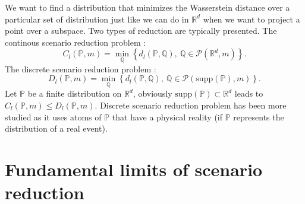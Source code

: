 \documentclass{amsart}
\newcommand{\RR}{\mathbb{R}}
\begin{document}
We want to find a distribution that minimizes the Wasserstein distance over a particular set of distribution just like we can do in $\RR^d$ when we want to project a point over a subspace. Two types of reduction are typically presented. The continous scenario reduction problem :
$$
C_l(\mathbb{P},m)=\min_\mathbb{Q}\left\{d_l(\mathbb{P},\mathbb{Q}),\: \mathbb{Q}\in\mathcal{P}(\mathbb{R}^d,m)\right\}. 
$$
The discrete scenario reduction problem :
$$
D_l(\mathbb{P},m)=\min_\mathbb{Q}\left\{d_l(\mathbb{P},\mathbb{Q}),\: \mathbb{Q}\in\mathcal{P}(\text{supp}(\mathbb{P}),m)\right\}.
$$
Let $\mathbb{P}$ be a finite distribution on $\RR^d$, obviously $\text{supp}(\mathbb{P})\subset \mathbb{R}^d$ leads to $C_l(\mathbb{P},m)\leq D_l(\mathbb{P},m)$. Discrete scenario reduction problem has been more studied as it uses atoms of $\mathbb{P}$ that have a physical reality (if $\mathbb{P}$ represents the distribution of a real event).

\section{Fundamental limits of scenario reduction}\label{limit}
\end{document}
